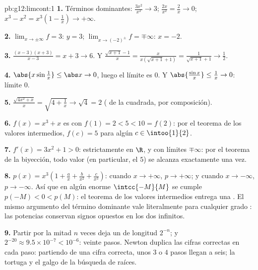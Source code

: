 \begin{solution}{pb:g12:limcont:1}
\textbf{1.} Términos dominantes: $\frac{3x^2}{x^2} \to 3$;
$\frac{2x}{x^2} = \frac2x \to 0$;
$x^3 - x^2 = x^3\left(1 - \frac1x\right) \to +\infty$.

\textbf{2.} $\lim_{x \to \pm\infty} f = 3$:  $y = 3$;
$\lim_{x \to (-2)^\pm} f = \mp\infty$:  $x = -2$.

\textbf{3.} $\frac{(x-3)(x+3)}{x - 3} = x + 3 \to 6$. Y
$\frac{\sqrt{x+1} - 1}{x} = \frac{x}{x(\sqrt{x+1} + 1)} =
\frac{1}{\sqrt{x+1} + 1} \to \frac12$.

\textbf{4.} $\abs{x \sin\frac1x} \leq \abs x \to 0$, luego el límite es
$0$. Y $\abs{\frac{\sin x}{x}} \leq \frac1x \to 0$: límite $0$.

\textbf{5.} $\frac{\sqrt{4x^2 + x}}{x} = \sqrt{4 + \frac1x} \to
\sqrt4 = 2$ ( de la  cuadrada, por composición).

\textbf{6.} $f(x) = x^3 + x$ es  con
$f(1) = 2 < 5 < 10 = f(2)$: por el teorema de los valores intermedios,
$f(c) = 5$ para algún $c \in \intoo{1}{2}$.

\textbf{7.} $f'(x) = 3x^2 + 1 > 0$: estrictamente  en $\R$,
 y con límites $\mp\infty$: por el teorema de la biyección, todo
valor (en particular, el $5$) se alcanza exactamente una vez.

\textbf{8.} $p(x) = x^3\left(1 + \frac ax + \frac{b}{x^2} +
\frac{c}{x^3}\right)$: cuando $x \to +\infty$, $p \to +\infty$; y cuando
$x \to -\infty$, $p \to -\infty$. Así que en algún  enorme
$\intcc{-M}{M}$ se cumple $p(-M) < 0 < p(M)$: el teorema de los valores
intermedios entrega una . El mismo argumento del término dominante
vale literalmente para cualquier grado : las potencias 
conservan signos opuestos en los dos infinitos.

\textbf{9.} Partir por la mitad $n$ veces deja un  de longitud
$2^{-n}$; y $2^{-20} \approx 9.5 \times 10^{-7} < 10^{-6}$: veinte pasos.
Newton duplica las cifras correctas en cada paso: partiendo de una cifra
correcta, unos $3$ o $4$ pasos llegan a seis; la tortuga y el galgo de la
búsqueda de raíces.


\end{solution}
